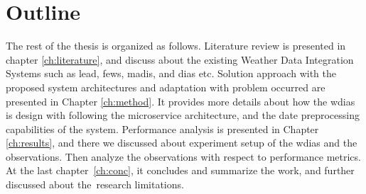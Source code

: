\section{Outline}
The rest of the thesis is organized as follows. Literature review is presented in chapter \ref{ch:literature}, and discuss about the existing Weather Data Integration Systems such as \acrshort{lead}, \acrshort{fews}, \acrshort{madis}, and \acrshort{dias} etc. Solution approach with the proposed system architectures and adaptation with problem occurred are presented in Chapter \ref{ch:method}. It provides more details about how the \acrshort{wdias} is design with following the microservice architecture, and the date preprocessing capabilities of the system. Performance analysis is presented in Chapter \ref{ch:results}, and there we discussed about experiment setup of the \acrshort{wdias} and the observations. Then analyze the observations with respect to performance metrics. At the last chapter \ref{ch:conc}, it concludes and summarize the work, and further discussed about the research limitations.
